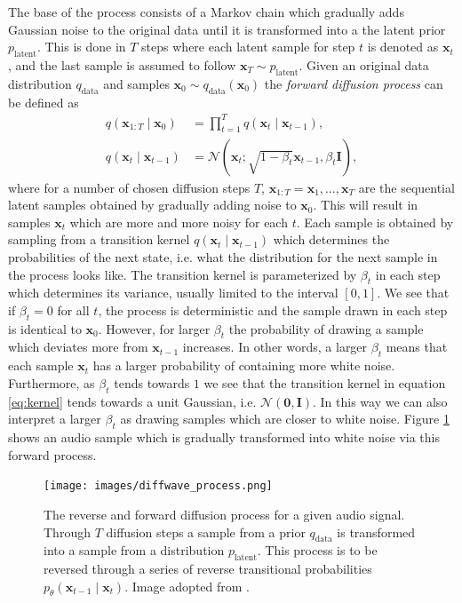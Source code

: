 \documentclass{report}
\begin{document}
The base of the process consists of a Markov chain which gradually adds Gaussian noise to the original data until it is transformed into a the latent prior $p_{\text{latent}}$. This is done in $T$ steps where each latent sample for step $t$ is denoted as $\bm{x}_t$, and the last sample is assumed to follow $\bm{x}_T \sim p_{\text{latent}}$. Given an original data distribution $q_{\text{data}}$ and samples $\bm{x}_0 \sim q_{\text{data}}(\bm{x}_0)$ the \textit{forward diffusion process} can be defined as
\begin{align}
    q(\bm{x}_{1:T} \mid \bm{x}_0) &= \prod_{t=1}^T q(\bm{x}_t \mid \bm{x}_{t-1}), \\
    q(\bm{x}_t \mid \bm{x}_{t-1}) &= \mathcal{N}(\bm{x}_t ; \sqrt{1-\beta_t} \bm{x}_{t-1}, \beta_t \textbf{I}), \label{eq:kernel}
\end{align}
where for a number of chosen diffusion steps $T$, $\bm{x}_{1:T} = \bm{x}_1, \dots, \bm{x}_T$ are the sequential latent samples obtained by gradually adding noise to $\bm{x}_0$. This will result in samples $\bm{x}_t$ which are more and more noisy for each $t$. Each sample is obtained by sampling from a transition kernel $q(\bm{x}_t \mid \bm{x}_{t-1})$ which determines the probabilities of the next state, i.e. what the distribution for the next sample in the process looks like. The transition kernel is parameterized by $\beta_t$ in each step which determines its variance, usually limited to the interval $[0, 1]$. We see that if $\beta_t = 0$ for all $t$, the process is deterministic and the sample drawn in each step is identical to $\bm{x}_0$. However, for larger $\beta_t$ the probability of drawing a sample which deviates more from $\bm{x}_{t-1}$ increases. In other words, a larger $\beta_t$ means that each sample $\bm{x}_t$ has a larger probability of containing more white noise. Furthermore, as $\beta_t$ tends towards $1$ we see that the transition kernel in equation \ref{eq:kernel} tends towards a unit Gaussian, i.e. $\mathcal{N}(\bm{0}, \bm{I})$. In this way we can also interpret a larger $\beta_t$ as drawing samples which are closer to white noise. Figure \ref{fig:diffwave1} shows an audio sample which is gradually transformed into white noise via this forward process.
\begin{figure}[H]
    \centering
    \texttt{[image: images/diffwave\_process.png]}
    \caption{\onehalfspacing The reverse and forward diffusion process for a given audio signal. Through $T$ diffusion steps a sample from a prior $q_{\text{data}}$ is transformed into a sample from a distribution $p_{\text{latent}}$. This process is to be reversed through a series of reverse transitional probabilities $p_{\theta}(\bm{x}_{t-1} \mid \bm{x}_{t})$. Image adopted from \cite{kong2020diffwave}.}
    \label{fig:diffwave1}
\end{figure}
\end{document}
